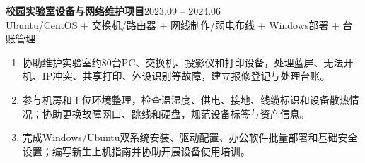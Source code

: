 \documentclass[10pt,a4paper]{ctexart}
\begin{document}

\vspace{5pt}
\noindent\textbf{校园实验室设备与网络维护项目}\hfill 2023.09 -- 2024.06\\
Ubuntu/CentOS + 交换机/路由器 + 网线制作/弱电布线 + Windows部署 + 台账管理
\begin{enumerate}
  \item 协助维护实验室约80台PC、交换机、投影仪和打印设备，处理蓝屏、无法开机、IP冲突、共享打印、外设识别等故障，建立报修登记与处理台账。
  \item 参与机房和工位环境整理，检查温湿度、供电、接地、线缆标识和设备散热情况；协助更换故障网口、跳线和硬盘，规范设备标签与资产信息。
  \item 完成Windows/Ubuntu双系统安装、驱动配置、办公软件批量部署和基础安全设置；编写新生上机指南并协助开展设备使用培训。
\end{enumerate}
\end{document}
